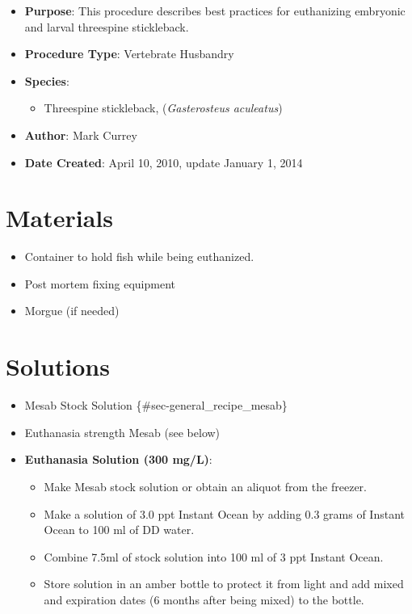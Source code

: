 \documentclass[
  letterpaper,
  DIV=11,
  numbers=noendperiod]{scrreprt}
\providecommand{\tightlist}{%
  \setlength{\itemsep}{0pt}\setlength{\parskip}{0pt}}\usepackage{longtable,booktabs,array}
\begin{document}
\begin{itemize}
\tightlist
\item
  \textbf{Purpose}: This procedure describes best practices for
  euthanizing embryonic and larval threespine stickleback.
\item
  \textbf{Procedure Type}: Vertebrate Husbandry
\item
  \textbf{Species}:

  \begin{itemize}
  \tightlist
  \item
    Threespine stickleback, (\emph{Gasterosteus aculeatus})
  \end{itemize}
\item
  \textbf{Author}: Mark Currey\\
\item
  \textbf{Date Created}: April 10, 2010, update January 1, 2014
\end{itemize}

\hypertarget{materials-30}{%
\section{Materials}\label{materials-30}}

\begin{itemize}
\tightlist
\item
  Container to hold fish while being euthanized.
\item
  Post mortem fixing equipment
\item
  Morgue (if needed)
\end{itemize}

\hypertarget{solutions-26}{%
\section{Solutions}\label{solutions-26}}

\begin{itemize}
\item
  Mesab Stock Solution \{\#sec-general\_recipe\_mesab\}
\item
  Euthanasia strength Mesab (see below)
\item
  \textbf{Euthanasia Solution (300 mg/L)}:

  \begin{itemize}
  \tightlist
  \item
    Make Mesab stock solution or obtain an aliquot from the freezer.
  \item
    Make a solution of 3.0 ppt Instant Ocean by adding 0.3 grams of
    Instant Ocean to 100 ml of DD water.
  \item
    Combine 7.5ml of stock solution into 100 ml of 3 ppt Instant Ocean.
  \item
    Store solution in an amber bottle to protect it from light and add
    mixed and expiration dates (6 months after being mixed) to the
    bottle.
  \end{itemize}
\end{itemize}
\end{document}
